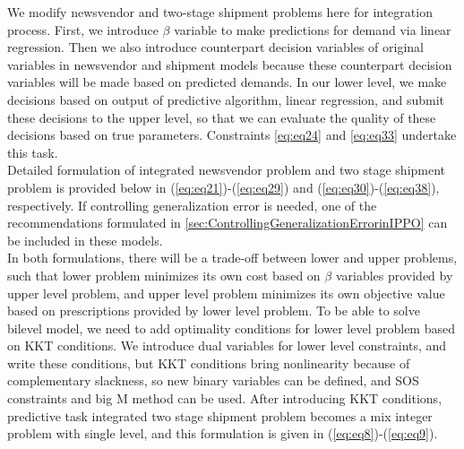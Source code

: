 \documentclass[12pt]{article}
\begin{document}
We modify newsvendor and two-stage shipment problems here for integration process. First, we introduce $\beta$ variable to make predictions for demand via linear regression. Then we also introduce counterpart decision variables of original variables in newsvendor and shipment models because these counterpart decision variables will be made based on predicted demands. In our lower level, we make decisions based on output of predictive algorithm, linear regression, and submit these decisions to the upper level, so that we can evaluate the quality of these decisions based on true parameters. Constraints \ref{eq:eq24} and \ref{eq:eq33} undertake this task.\\
Detailed formulation of integrated newsvendor problem and  two stage shipment problem is provided below in (\ref{eq:eq21})-(\ref{eq:eq29}) and (\ref{eq:eq30})-(\ref{eq:eq38}), respectively. If controlling generalization error is needed, one of the recommendations formulated in \autoref{sec:ControllingGeneralizationErrorinIPPO} can be included in these models.\\
In both formulations, there will be a trade-off between lower and upper problems, such that lower problem minimizes its own cost based on $\beta$ variables provided by upper level problem, and upper level problem minimizes its own objective value based on prescriptions provided by lower level problem. To be able to solve bilevel model, we need to add optimality conditions for lower level problem based on KKT conditions. We introduce dual variables for lower level constraints, and write these conditions, but KKT conditions bring nonlinearity because of complementary slackness, so new binary variables can be defined, and SOS constraints and big M method can be used. After introducing KKT conditions, predictive task integrated two stage shipment problem becomes a mix integer problem with single level, and this formulation is given in (\ref{eq:eq8})-(\ref{eq:eq9}).
\end{document}
